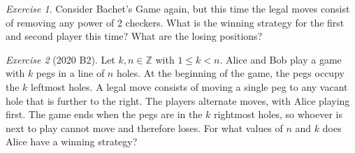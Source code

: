 \documentclass{article}
\theoremstyle{definition}
\theoremstyle{remark}
\newtheorem{exercise}{Exercise}
\newcommand{\ZZ}{\mathbb{Z}}
\begin{document}
    \begin{exercise}
        Consider Bachet's Game again, but this time the legal moves consist of removing any power of 2 checkers.
        What is the winning strategy for the first and second player this time?
        What are the losing positions?
    \end{exercise}

    \begin{exercise}[2020 B2]
        Let \(k,n\in\ZZ\) with \(1\leq k<n\).
        Alice and Bob play a game with \(k\) pegs in a line of \(n\) holes.
        At the beginning of the game, the pegs occupy the \(k\) leftmost holes.
        A legal move consists of moving a single peg to any vacant hole that is further to the right.
        The players alternate moves, with Alice playing first.
        The game ends when the pegs are in the \(k\) rightmost holes, so whoever is next to play cannot move and therefore loses.
        For what values of \(n\) and \(k\) does Alice have a winning strategy?
    \end{exercise}
\end{document}

